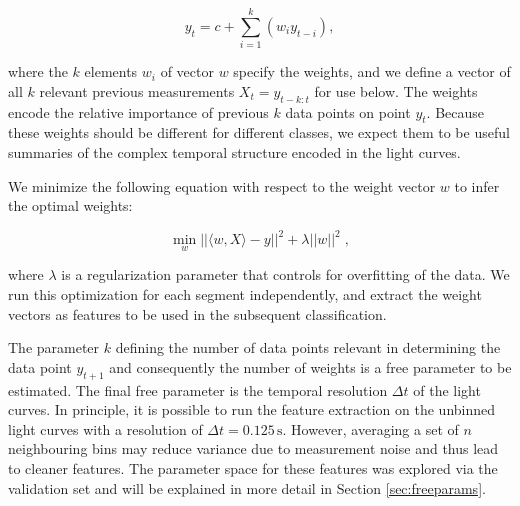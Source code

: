 \documentclass[fleqn,usenatbib]{mnras}
\begin{document}
\begin{equation}
y_{t} = c + \sum_{i=1}^k{\left( w_i y_{t-i}\right)} ,
\end{equation}

\noindent  where the $k$ elements $w_i$ of vector $w$ specify the weights, and we define a vector of all $k$ relevant previous measurements $X_t = y_{t-k:t}$ for use below. The weights encode the relative importance of previous $k$ data points on point $y_{t}$. Because these weights should be different for different classes, we expect them to be useful summaries of the complex temporal structure encoded in the light curves.

We minimize the following equation with respect to the weight vector $w$ to infer the optimal weights:

\begin{equation}
\min_w ||\langle w, X \rangle - y||^2 + \lambda ||w||^2 \; ,
\end{equation}

\noindent where $\lambda$ is a regularization parameter that controls for overfitting of the data. We run this optimization for each segment independently, and extract the weight vectors as features to be used in the subsequent classification.

The parameter $k$ defining the number of data points relevant in determining the data point $y_{t+1}$ and consequently the number of weights is a free parameter to be estimated. The final free parameter is the temporal resolution $\Delta t$ of the light curves. In principle, it is possible to run the feature extraction on the unbinned light curves with a resolution of $\Delta t = 0.125\,\mathrm{s}$. However, averaging a set of $n$ neighbouring bins may reduce variance due to measurement noise and thus lead to cleaner features. The parameter space for these features was explored via the validation set and will be explained in more detail in Section \ref{sec:freeparams}.
\end{document}
